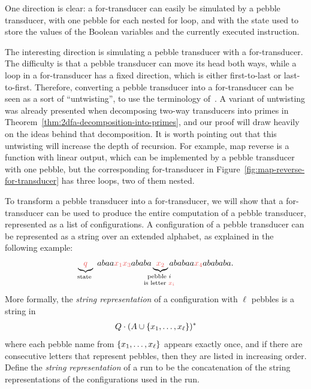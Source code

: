 One direction is clear: a for-transducer can easily be simulated by a pebble transducer, with one pebble for each nested for loop, and with the state used to store the values of the Boolean variables and the currently executed instruction. 

The interesting direction is simulating a pebble transducer with a for-transducer.
The difficulty is that a pebble transducer can move its head both ways, while a loop in a for-transducer has a fixed direction, which is either first-to-last or last-to-first.  Therefore, converting a pebble transducer into a for-transducer can be seen as a sort of ``untwisting'', to use the terminology of~\cite{baschenis2017}. A variant of untwisting was already presented when decomposing two-way transducers into primes in Theorem~\ref{thm:2dfa-decomposition-into-primes}, and our proof will draw heavily on the ideas behind that decomposition. It is worth pointing out that this untwisting will increase the depth of recursion. For example, map reverse is a function with linear output, which can be implemented by a pebble transducer with one pebble, but the corresponding for-transducer in Figure~\ref{fig:map-reverse-for-transducer} has three loops, two of them nested.




To transform a pebble transducer into a for-transducer, we will show that a for-transducer can be used to produce the entire computation of a pebble transducer, represented as a list of configurations.
A configuration of a pebble transducer can be represented as a string over an extended alphabet, as explained in the following example:
\begin{align*}
\myunderbrace{\red q}{state}\ abaa \red{x_1 x_3} ababa \myunderbrace{\red{x_2}}{pebble $i$ \\ is letter $\red{x_i}$} ababaa \red{x_4} abababa.
\end{align*}
More formally, the \emph{string representation} of a configuration with $\ell$ pebbles is a string in 
\begin{align*}
Q \cdot (A \cup \{x_1,\ldots,x_\ell\})^*
\end{align*}
where each pebble name from $\{x_1,\ldots,x_\ell\}$ appears exactly once, and if there are consecutive letters that represent pebbles, then they are listed in increasing order. Define the \emph{string representation} of a run to be the concatenation of the string representations of the configurations used in the run. 

